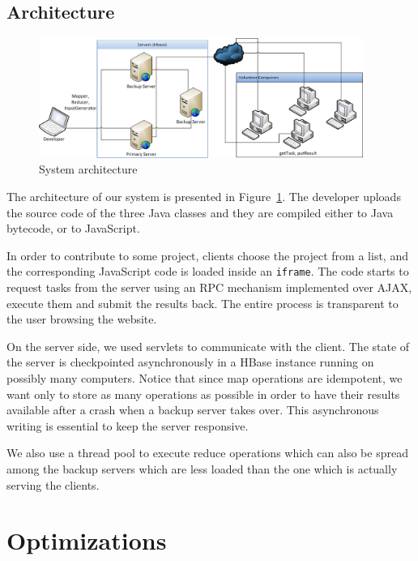 \documentclass[letterpaper,twocolumn,10pt]{article}
\begin{document}
\subsection{Architecture}

\begin{figure}[!ht]
\begin{center}
\includegraphics[width=400px]{../imgs/architecture.png}
\end{center}
\caption{System architecture}
\label{fig:architecture}
\end{figure}

The architecture of our system is presented in Figure~\ref{fig:architecture}.
The developer uploads the source code of the three Java classes and they are
compiled either to Java bytecode, or to JavaScript.

In order to contribute to some project, clients choose the project from a list,
and the corresponding JavaScript code is loaded inside an {\small \tt iframe}.
The code starts to request tasks from the server using an RPC mechanism
implemented over AJAX, execute them and submit the results back. The entire
process is transparent to the user browsing the website.

On the server side, we used servlets to communicate with the client. The state
of the server is checkpointed asynchronously in a HBase instance running on
possibly many computers. Notice that since map operations are idempotent, we 
want only to store as many operations as possible in order to have their results
available after a crash when a backup server takes over. This asynchronous
writing is essential to keep the server responsive. 

We also use a thread pool to execute reduce operations which can also be spread
among the backup servers which are less loaded than the one which is actually
serving the clients.

\section{Optimizations}
\label{optimizations}
\end{document}
